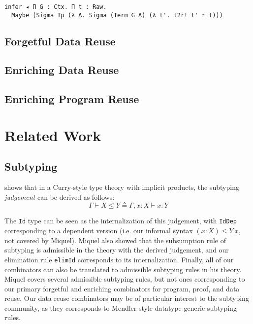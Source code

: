 \documentclass[acmsmall]{acmart}\settopmatter{}
\newcommand{\labsec}[1]{\label{sec:#1}}
\begin{document}
\begin{verbatim}
infer ◂ Π G : Ctx. Π t : Raw.
  Maybe (Sigma Tp (λ A. Sigma (Term G A) (λ t'. t2r! t' ≃ t)))
\end{verbatim}


\subsection{Forgetful Data Reuse}
\labsec{rel:dfog}

\subsection{Enriching Data Reuse}
\labsec{rel:denr}

\subsection{Enriching Program Reuse}
\labsec{rel:penr}

\section{Related Work}
\labsec{others}

\subsection{Subtyping}
\labsec{others:judg}

\citet{miquel01} shows that in a Curry-style type theory with implicit
products, the subtyping \textit{judgement} can be derived as follows:
$$
\Gamma\vdash X \leq Y \triangleq \Gamma,x:X\vdash x:Y
$$

The \verb;Id; type can be seen as the internalization of this
judgement, with \verb;IdDep; corresponding to a dependent version
(i.e. our informal syntax $(x:X) \leq Y~x$, not covered by Miquel).
Miquel also showed that the subsumption rule of subtyping is
admissible in the theory with the derived judgement, and our
elimination rule \verb;elimId; corresponds to its internalization.
Finally, all of our combinators can also be translated to admissible
subtyping rules in his theory. Miquel covers several admissible
subtyping rules, but not ones corresponding to our primary forgetful
and enriching combinators for program, proof, and data reuse. Our data
reuse combinators may be of particular interest to the subtyping
community, as they corresponds to Mendler-style datatype-generic
subtyping rules.
\end{document}
